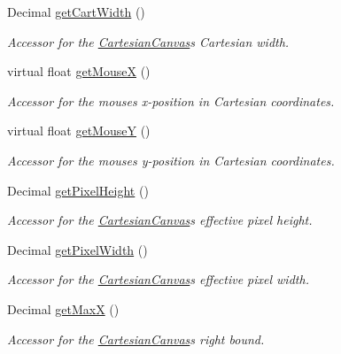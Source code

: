 \begin{DoxyCompactItemize}
Decimal \hyperlink{classtsgl_1_1_cartesian_canvas_a829a97323261515097b7589bc96c109c}{get\+Cart\+Width} ()
\begin{DoxyCompactList}\small\item\em Accessor for the \hyperlink{classtsgl_1_1_cartesian_canvas}{Cartesian\+Canvas}\textquotesingle{}s Cartesian width. \end{DoxyCompactList}\item 
virtual float \hyperlink{classtsgl_1_1_cartesian_canvas_afd62dffbd1343ddecdd734a6954f6f87}{get\+MouseX} ()
\begin{DoxyCompactList}\small\item\em Accessor for the mouse\textquotesingle{}s x-\/position in Cartesian coordinates. \end{DoxyCompactList}\item 
virtual float \hyperlink{classtsgl_1_1_cartesian_canvas_a4513bbe2483ebf043aabb200c1a8d456}{get\+MouseY} ()
\begin{DoxyCompactList}\small\item\em Accessor for the mouse\textquotesingle{}s y-\/position in Cartesian coordinates. \end{DoxyCompactList}\item 
Decimal \hyperlink{classtsgl_1_1_cartesian_canvas_a699c2b41b3b46bfac8649fb38b24c901}{get\+Pixel\+Height} ()
\begin{DoxyCompactList}\small\item\em Accessor for the \hyperlink{classtsgl_1_1_cartesian_canvas}{Cartesian\+Canvas}\textquotesingle{}s effective pixel height. \end{DoxyCompactList}\item 
Decimal \hyperlink{classtsgl_1_1_cartesian_canvas_ac9bb990b8c34a1575bcb861e4b819372}{get\+Pixel\+Width} ()
\begin{DoxyCompactList}\small\item\em Accessor for the \hyperlink{classtsgl_1_1_cartesian_canvas}{Cartesian\+Canvas}\textquotesingle{}s effective pixel width. \end{DoxyCompactList}\item 
Decimal \hyperlink{classtsgl_1_1_cartesian_canvas_ae3cbac386f78ecff082b8c4cbd9081ed}{get\+MaxX} ()
\begin{DoxyCompactList}\small\item\em Accessor for the \hyperlink{classtsgl_1_1_cartesian_canvas}{Cartesian\+Canvas}\textquotesingle{}s right bound. \end{DoxyCompactList}\item 

\end{DoxyCompactItemize}
